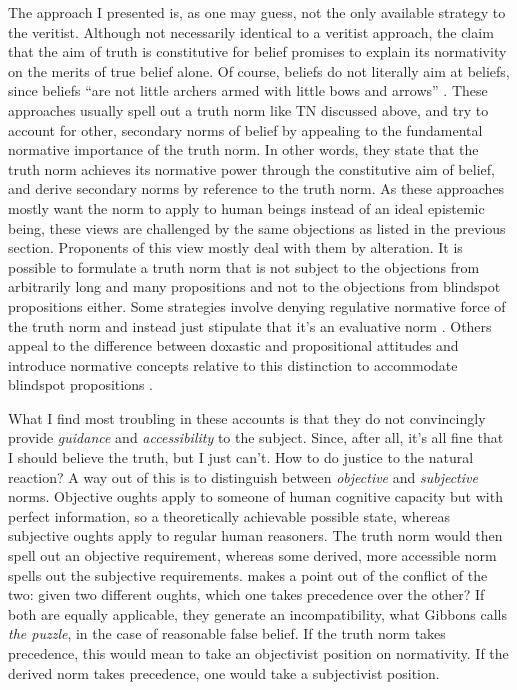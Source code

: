 \documentclass[12pt,numbers=noenddot]{scrartcl}
\begin{document}
The approach I presented is, as one may guess, not the only available strategy to the veritist. Although not necessarily identical to a veritist approach, the claim that the aim of truth is constitutive for belief promises to explain its normativity on the merits of true belief alone. Of course, beliefs do not literally aim at beliefs, since beliefs “are not little archers armed with little bows and arrows” \autocite[267]{Wedgwood2002-WEDTAO}. These approaches usually spell out a truth norm like TN discussed above, and try to account for other, secondary norms of belief by appealing to the fundamental normative importance of the truth norm. In other words, they state that the truth norm achieves its normative power through the constitutive aim of belief, and derive secondary norms by reference to the truth norm. As these approaches mostly want the norm to apply to human beings instead of an ideal epistemic being, these views are challenged by the same objections as listed in the previous section. Proponents of this view mostly deal with them by alteration. It is possible to formulate a truth norm that is not subject to the objections from arbitrarily long and many propositions \autocite[159]{David2001-DAVTAT-7} and not to the objections from blindspot propositions \autocite{Greenberg2016-GREITN} either. Some strategies involve denying regulative normative force of the truth norm and instead just stipulate that it's an evaluative norm \autocite{Mchugh2012-MCHTTN}. Others appeal to the difference between doxastic and propositional attitudes and introduce normative concepts relative to this distinction to accommodate blindspot propositions \autocite{Wedgwood2013-WEDTRT}. 

What I find most troubling in these accounts is that they do not convincingly provide \emph{guidance} and \emph{accessibility} to the subject. Since, after all, it's all fine that I should believe the truth, but I just can't. How to do justice to the natural reaction? A way out of this is to distinguish between \emph{objective} and \emph{subjective} norms. Objective oughts apply to someone of human cognitive capacity but with perfect information, so a theoretically achievable possible state, whereas subjective oughts apply to regular human reasoners. The truth norm would then spell out an objective requirement, whereas some derived, more accessible norm spells out the subjective requirements. \textcite[Ch. 2]{Gibbons2013-GIBTNO} makes a point out of the conflict of the two: given two different oughts, which one takes precedence over the other? If both are equally applicable, they generate an incompatibility, what Gibbons calls \emph{the puzzle}, in the case of reasonable false belief. If the truth norm takes precedence, this would mean to take an objectivist position on normativity. If the derived norm takes precedence, one would take a subjectivist position.
\end{document}
